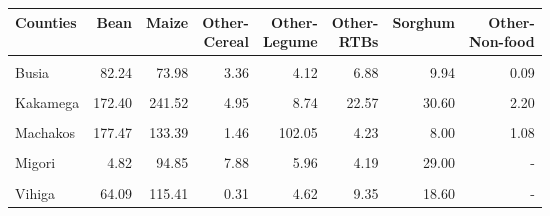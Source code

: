 \begin{table}[!h]
\centering\begingroup\fontsize{7}{9}\selectfont

\begin{tabular}{>{\raggedright\arraybackslash}p{1.8cm}rrrrrrr}
\toprule
Counties & Bean & Maize & \makecell{Other-\\Cereal} & \makecell{Other-\\Legume} & \makecell{Other-\\RTBs} & Sorghum & \makecell{Other-\\Non-food}\\
\midrule
\cellcolor{gray!10}{Bungoma} & \cellcolor{gray!10}{156.36} & \cellcolor{gray!10}{106.23} & \cellcolor{gray!10}{2.80} & \cellcolor{gray!10}{4.87} & \cellcolor{gray!10}{10.77} & \cellcolor{gray!10}{13.84} & \cellcolor{gray!10}{-}\\
Busia & 82.24 & 73.98 & 3.36 & 4.12 & 6.88 & 9.94 & 0.09\\
\cellcolor{gray!10}{Homa Bay} & \cellcolor{gray!10}{1.82} & \cellcolor{gray!10}{89.22} & \cellcolor{gray!10}{8.86} & \cellcolor{gray!10}{22.24} & \cellcolor{gray!10}{0.62} & \cellcolor{gray!10}{26.72} & \cellcolor{gray!10}{0.93}\\
Kakamega & 172.40 & 241.52 & 4.95 & 8.74 & 22.57 & 30.60 & 2.20\\
\cellcolor{gray!10}{Kisii} & \cellcolor{gray!10}{0.26} & \cellcolor{gray!10}{140.27} & \cellcolor{gray!10}{22.97} & \cellcolor{gray!10}{6.20} & \cellcolor{gray!10}{1.48} & \cellcolor{gray!10}{9.23} & \cellcolor{gray!10}{0.85}\\
\addlinespace
Machakos & 177.47 & 133.39 & 1.46 & 102.05 & 4.23 & 8.00 & 1.08\\
\cellcolor{gray!10}{Makueni} & \cellcolor{gray!10}{82.97} & \cellcolor{gray!10}{44.61} & \cellcolor{gray!10}{0.48} & \cellcolor{gray!10}{59.93} & \cellcolor{gray!10}{0.58} & \cellcolor{gray!10}{3.34} & \cellcolor{gray!10}{-}\\
Migori & 4.82 & 94.85 & 7.88 & 5.96 & 4.19 & 29.00 & -\\
\cellcolor{gray!10}{Narok} & \cellcolor{gray!10}{11.86} & \cellcolor{gray!10}{118.57} & \cellcolor{gray!10}{4.42} & \cellcolor{gray!10}{0.44} & \cellcolor{gray!10}{0.86} & \cellcolor{gray!10}{1.17} & \cellcolor{gray!10}{0.06}\\
Vihiga & 64.09 & 115.41 & 0.31 & 4.62 & 9.35 & 18.60 & -\\
\bottomrule
\end{tabular}
\endgroup{}
\end{table}

